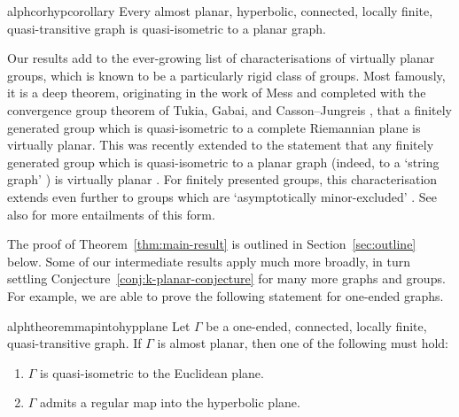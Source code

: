 \documentclass[11pt,a4paper]{amsart}
\theoremstyle{definition}
\begin{document}
\begin{restatable}{alphcor}{hypcorollary}\label{cor:intro-hypgroups}
    Every almost planar, hyperbolic, connected, locally finite, quasi-transitive graph is quasi-isometric to a planar graph.
\end{restatable}



Our results add to the ever-growing list of characterisations of virtually planar groups, which is known to be a particularly rigid class of groups. Most famously, it is a deep theorem, originating in the work of Mess \cite{mess1988seifert} and completed with the convergence group theorem of Tukia, Gabai, and Casson--Jungreis \cite{tukia1988homeomorphic, gabai1992convergence, casson1994convergence}, that a finitely generated group which is quasi-isometric to a complete Riemannian plane is virtually planar. This was recently extended to the statement that any finitely generated group which is quasi-isometric to a planar graph (indeed, to a `string graph' \cite{davies2025string}) is virtually planar \cite{macmanus2023accessibility}. For finitely presented groups, this characterisation extends even further to groups which are `asymptotically minor-excluded'  \cite{macmanus2025fat}. 
See also \cite{bowditch2004planar, Esperet_Giocanti_2024, macmanus2025vertex, maillot2001quasi} for more entailments of this form.



The proof of Theorem~\ref{thm:main-result} is outlined in Section~\ref{sec:outline} below.  
Some of our intermediate results apply much more broadly, in turn settling Conjecture~\ref{conj:k-planar-conjecture} for many more graphs and groups. For example, we are able to prove the following statement for one-ended graphs. 

\begin{restatable}{alphtheorem}{mapintohypplane}\label{thm:intro-hyperbolic-plane}
    Let $\Gamma$ be a one-ended, connected, locally finite,  quasi-transitive graph. If $\Gamma$ is almost planar, then one of the following must hold:
    \begin{enumerate}
        \item $\Gamma$ is quasi-isometric to the Euclidean plane.

		\item $\Gamma$ admits a regular map into the hyperbolic plane.
    \end{enumerate}
\end{restatable}
\end{document}
